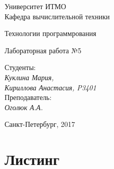 \documentclass[12pt, a4paper] {ncc}
\begin{document}
\setcounter{figure}{0}
\frenchspacing
\pagestyle{empty}
\begin{center}
                            Университет ИТМО    \\
                        Кафедра вычислительной техники

                    Технологии программрования
\end{center}
\begin{center}
                            Лабораторная работа №5\\
\end{center}
\begin{flushright}
                                    Студенты:\\
                                    {\it Куклина Мария,}\\
                                    {\it Кириллова Анастасия, P3401}\\
                                    Преподаватель: \\
                                    {\it Оголюк А.А.}
\end{flushright}
\begin{center}
                             Санкт-Петербург, 2017
\end{center}
\newpage

\section{Листинг}
	
	
	
	
\end{document}
